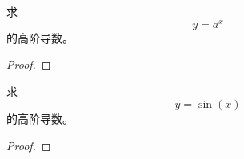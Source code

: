 \begin{example}
    求
    \begin{equation*}
        y = a^x
    \end{equation*}
    的高阶导数。
\end{example}
\begin{proof}
    
\end{proof}

\begin{example}
    求
    \begin{equation*}
        y = \sin(x)
    \end{equation*}
    的高阶导数。
\end{example}
\begin{proof}
    
\end{proof}